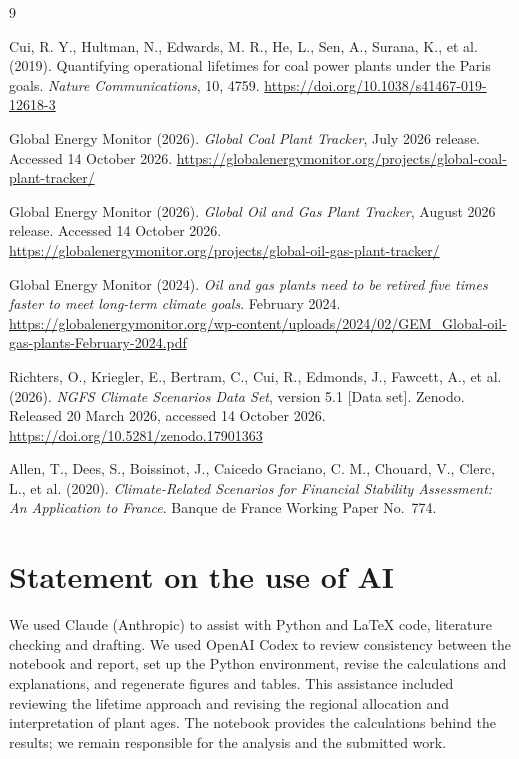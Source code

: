 \documentclass[11pt,a4paper]{article}
\begin{document}
\clearpage
\begin{thebibliography}{9}
\small

Cui, R. Y., Hultman, N., Edwards, M. R., He, L., Sen, A., Surana, K., et al. (2019). Quantifying operational lifetimes for coal power plants under the Paris goals. \emph{Nature Communications}, 10, 4759. \url{https://doi.org/10.1038/s41467-019-12618-3}

Global Energy Monitor (2026). \emph{Global Coal Plant Tracker}, July 2026 release. Accessed 14 October 2026. \url{https://globalenergymonitor.org/projects/global-coal-plant-tracker/}

Global Energy Monitor (2026). \emph{Global Oil and Gas Plant Tracker}, August 2026 release. Accessed 14 October 2026. \url{https://globalenergymonitor.org/projects/global-oil-gas-plant-tracker/}

Global Energy Monitor (2024). \emph{Oil and gas plants need to be retired five times faster to meet long-term climate goals}. February 2024. \url{https://globalenergymonitor.org/wp-content/uploads/2024/02/GEM_Global-oil-gas-plants-February-2024.pdf}

Richters, O., Kriegler, E., Bertram, C., Cui, R., Edmonds, J., Fawcett, A., et al. (2026). \emph{NGFS Climate Scenarios Data Set}, version 5.1 {[}Data set{]}. Zenodo. Released 20 March 2026, accessed 14 October 2026. \url{https://doi.org/10.5281/zenodo.17901363}

Allen, T., Dees, S., Boissinot, J., Caicedo Graciano, C. M., Chouard, V., Clerc, L., et al. (2020). \emph{Climate-Related Scenarios for Financial Stability Assessment: An Application to France}. Banque de France Working Paper No.~774.

\end{thebibliography}

\section*{Statement on the use of AI}
\small

We used Claude (Anthropic) to assist with Python and LaTeX code, literature checking and drafting. We used OpenAI Codex to review consistency between the notebook and report, set up the Python environment, revise the calculations and explanations, and regenerate figures and tables. This assistance included reviewing the lifetime approach and revising the regional allocation and interpretation of plant ages. The notebook provides the calculations behind the results; we remain responsible for the analysis and the submitted work.
\end{document}
